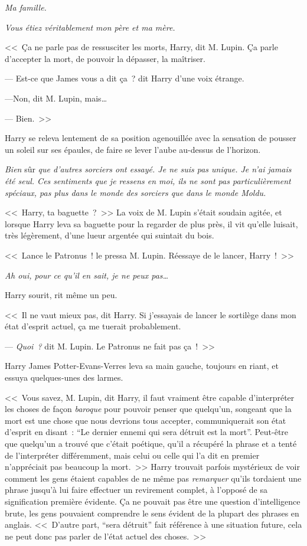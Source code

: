 \emph{Ma famille.}

\emph{Vous étiez véritablement mon père et ma mère.}

<<~Ça ne parle pas de ressusciter les morts, Harry, dit M. Lupin. Ça parle d'accepter la mort, de pouvoir la dépasser, la maîtriser.

--- Est-ce que James vous a dit ça~? dit Harry d'une voix étrange.

---Non, dit M. Lupin, mais…

--- Bien.~>>

Harry se releva lentement de sa position agenouillée avec la sensation de pousser un soleil sur ses épaules, de faire se lever l'aube au-dessus de l'horizon.

\emph{Bien} sûr \emph{que d'autres sorciers ont essayé. Je ne suis pas unique. Je n'ai jamais été seul. Ces sentiments que je ressens en moi, ils ne sont pas particulièrement spéciaux, pas plus dans le monde des sorciers que dans le monde Moldu.}

<<~Harry, ta baguette~?~>> La voix de M. Lupin s'était soudain agitée, et lorsque Harry leva sa baguette pour la regarder de plus près, il vit qu'elle luisait, très légèrement, d'une lueur argentée qui suintait du bois.

<<~Lance le Patronus~! le pressa M. Lupin. Réessaye de le lancer, Harry~!~>>

\emph{Ah oui, pour ce qu'il en sait, je ne peux pas…}

Harry sourit, rit même un peu.

<<~Il ne vaut mieux pas, dit Harry. Si j'essayais de lancer le sortilège dans mon état d'esprit actuel, ça me tuerait probablement.

--- \emph{Quoi~?} dit M. Lupin. Le Patronus ne fait pas ça~!~>>

Harry James Potter-Evans-Verres leva sa main gauche, toujours en riant, et essuya quelques-unes des larmes.

<<~Vous savez, M. Lupin, dit Harry, il faut vraiment être capable d'interpréter les choses de façon \emph{baroque} pour pouvoir penser que quelqu'un, songeant que la mort est une chose que nous devrions tous accepter, communiquerait son état d'esprit en disant~: “Le dernier ennemi qui sera détruit est la mort”. Peut-être que quelqu'un a trouvé que c'était poétique, qu'il a récupéré la phrase et a tenté de l'interpréter différemment, mais celui ou celle qui l'a dit en premier n'appréciait pas beaucoup la mort.~>> Harry trouvait parfois mystérieux de voir comment les gens étaient capables de ne même pas \emph{remarquer} qu'ils tordaient une phrase jusqu'à lui faire effectuer un revirement complet, à l'opposé de sa signification première évidente. Ça ne pouvait pas être une question d'intelligence brute, les gens pouvaient comprendre le sens évident de la plupart des phrases en anglais. <<~D'autre part, “sera détruit” fait référence à une situation future, cela ne peut donc pas parler de l'état actuel des choses.~>>

